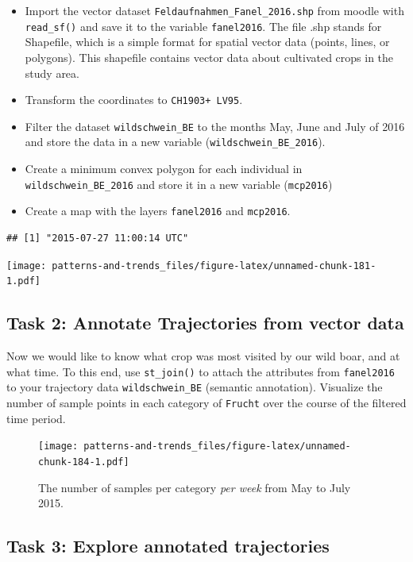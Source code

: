 \documentclass[]{book}
\providecommand{\tightlist}{%
  \setlength{\itemsep}{0pt}\setlength{\parskip}{0pt}}
\begin{document}
\begin{itemize}
\tightlist
\item
  Import the vector dataset \texttt{Feldaufnahmen\_Fanel\_2016.shp} from
  moodle with \texttt{read\_sf()} and save it to the variable
  \texttt{fanel2016}. The file .shp stands for Shapefile, which is a
  simple format for spatial vector data (points, lines, or polygons).
  This shapefile contains vector data about cultivated crops in the
  study area.
\item
  Transform the coordinates to \texttt{CH1903+\ LV95}.
\item
  Filter the dataset \texttt{wildschwein\_BE} to the months May, June
  and July of 2016 and store the data in a new variable
  (\texttt{wildschwein\_BE\_2016}).
\item
  Create a minimum convex polygon for each individual in
  \texttt{wildschwein\_BE\_2016} and store it in a new variable
  (\texttt{mcp2016})
\item
  Create a map with the layers \texttt{fanel2016} and \texttt{mcp2016}.
\end{itemize}

\begin{verbatim}
## [1] "2015-07-27 11:00:14 UTC"
\end{verbatim}

\texttt{[image: patterns-and-trends\_files/figure-latex/unnamed-chunk-181-1.pdf]}

\subsection{Task 2: Annotate Trajectories from vector
data}\label{task-2-annotate-trajectories-from-vector-data}

Now we would like to know what crop was most visited by our wild boar,
and at what time. To this end, use \texttt{st\_join()} to attach the
attributes from \texttt{fanel2016} to your trajectory data
\texttt{wildschwein\_BE} (semantic annotation). Visualize the number of
sample points in each category of \texttt{Frucht} over the course of the
filtered time period.

\begin{figure}
\centering
\texttt{[image: patterns-and-trends\_files/figure-latex/unnamed-chunk-184-1.pdf]}
\caption{\label{fig:unnamed-chunk-184}The number of samples per category
\emph{per week} from May to July 2015.}
\end{figure}

\subsection{Task 3: Explore annotated
trajectories}\label{task-3-explore-annotated-trajectories}
\end{document}
